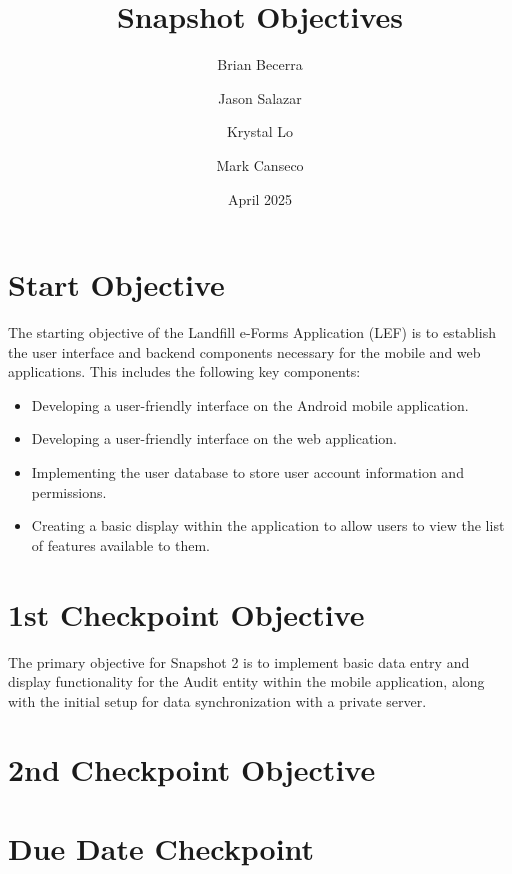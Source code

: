 \documentclass[12pt]{article}
\title{Snapshot Objectives}
\author{
    Brian Becerra\\
    \and
    Jason Salazar\\
    \and
    Krystal Lo\\
    \and
    Mark Canseco\\
    }
\date{April 2025}
\begin{document}
\begin{titlepage}
\maketitle
\thispagestyle{empty}
\end{titlepage}

\section*{Start Objective}
The starting objective of the Landfill e-Forms Application (LEF) is to establish the user interface and backend components necessary for the mobile and web applications. This includes the following key components:\\
\begin{itemize}
    \item Developing a user-friendly interface on the Android mobile application.
    \item  Developing a user-friendly interface on the web application.
    \item Implementing the user database to store user account information and permissions.
    \item Creating a basic display within the application to allow users to view the list of features available to them. 
\end{itemize}

\section*{1st Checkpoint Objective}

The primary objective for Snapshot 2 is to implement basic data entry and display functionality for the Audit entity within the mobile application, along with the initial setup for data synchronization with a private server.

\section*{2nd Checkpoint Objective}

\section*{Due Date Checkpoint}
\end{document}
